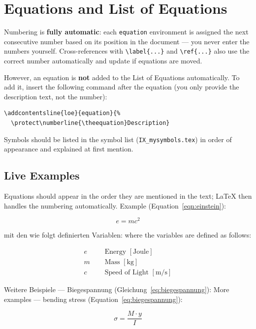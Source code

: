 \else
  \section{Equations and List of Equations}
  Numbering is \textbf{fully automatic}: each \texttt{equation} environment is assigned the next consecutive number based on its position in the document — you never enter the numbers yourself. Cross-references with \verb|\label{...}| and \verb|\ref{...}| also use the correct number automatically and update if equations are moved.

  However, an equation is \textbf{not} added to the List of Equations automatically. To add it, insert the following command after the equation (you only provide the description text, not the number):
  \begin{verbatim}
\addcontentsline{loe}{equation}{%
  \protect\numberline{\theequation}Description}
  \end{verbatim}

  Symbols should be listed in the symbol list (\texttt{IX\_mysymbols.tex}) in order of appearance and explained at first mention.

  \subsection{Live Examples}
  Equations should appear in the order they are mentioned in the text; \LaTeX{} then handles the numbering automatically.
  Example (Equation~\ref{eqn:einstein}):
\fi

\begin{equation}\label{eqn:einstein}
  e = m c^2
\end{equation}

\ifnum{}
  mit den wie folgt definierten Variablen:
\else
  where the variables are defined as follows:
\fi

\begin{align*}
  e\phantom{=} & \text{Energy } [\text{Joule}]       \\
  m\phantom{=} & \text{Mass } [\text{kg}]            \\
  c\phantom{=} & \text{Speed of Light } [\text{m/s}]
\end{align*}

\ifnum{}
  Weitere Beispiele — Biegespannung (Gleichung~\ref{eq:biegespannung}):
\else
  More examples — bending stress (Equation~\ref{eq:biegespannung}):
\fi

\begin{equation}
  \sigma = \frac{M \cdot y}{I}
\end{equation}
\label{eq:biegespannung}

